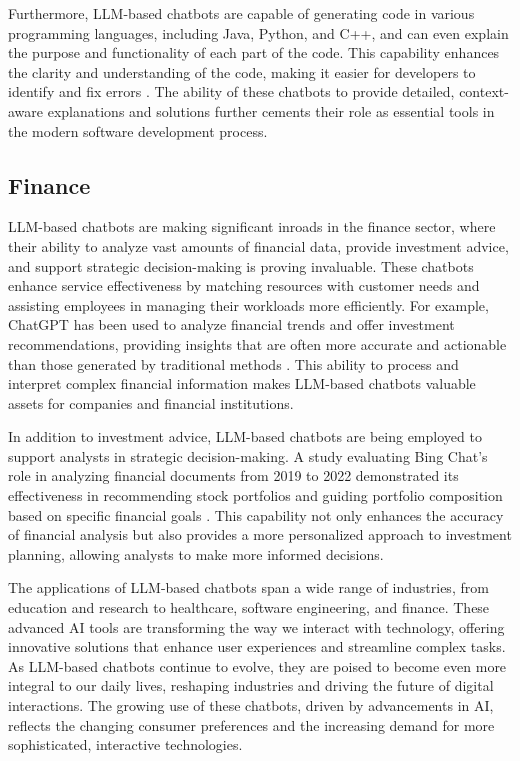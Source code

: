 Furthermore, LLM-based chatbots are capable of generating code in various programming languages, including Java, Python, and C++, and can even explain the purpose and functionality of each part of the code. This capability enhances the clarity and understanding of the code, making it easier for developers to identify and fix errors \cite{dam2024complete}. The ability of these chatbots to provide detailed, context-aware explanations and solutions further cements their role as essential tools in the modern software development process.

\subsection{Finance}

LLM-based chatbots are making significant inroads in the finance sector, where their ability to analyze vast amounts of financial data, provide investment advice, and support strategic decision-making is proving invaluable. These chatbots enhance service effectiveness by matching resources with customer needs and assisting employees in managing their workloads more efficiently. For example, ChatGPT has been used to analyze financial trends and offer investment recommendations, providing insights that are often more accurate and actionable than those generated by traditional methods \cite{dowling2023chatgpt}. This ability to process and interpret complex financial information makes LLM-based chatbots valuable assets for companies and financial institutions.

In addition to investment advice, LLM-based chatbots are being employed to support analysts in strategic decision-making. A study evaluating Bing Chat's role in analyzing financial documents from 2019 to 2022 demonstrated its effectiveness in recommending stock portfolios and guiding portfolio composition based on specific financial goals \cite{altan2023science}. This capability not only enhances the accuracy of financial analysis but also provides a more personalized approach to investment planning, allowing analysts to make more informed decisions.

The applications of LLM-based chatbots span a wide range of industries, from education and research to healthcare, software engineering, and finance. These advanced AI tools are transforming the way we interact with technology, offering innovative solutions that enhance user experiences and streamline complex tasks. As LLM-based chatbots continue to evolve, they are poised to become even more integral to our daily lives, reshaping industries and driving the future of digital interactions. The growing use of these chatbots, driven by advancements in AI, reflects the changing consumer preferences and the increasing demand for more sophisticated, interactive technologies.

